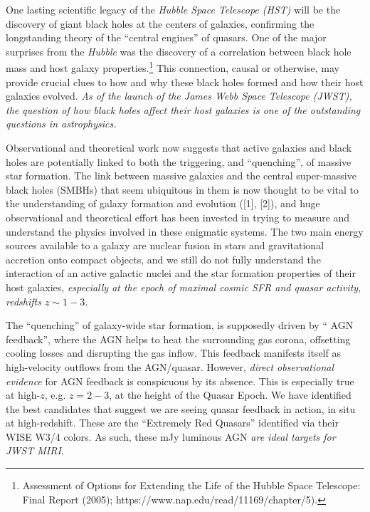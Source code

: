 One lasting scientific legacy of the {\it Hubble Space Telescope
(HST)} will be the discovery of giant black holes at the centers of
galaxies, confirming the longstanding theory of the ``central
engines'' of quasars.  One of the major surprises from the {\it
Hubble} was the discovery of a correlation between black hole mass and
host galaxy properties.\footnote{Assessment of Options for Extending
the Life of the Hubble Space Telescope: Final Report (2005);
https://www.nap.edu/read/11169/chapter/5).}  This connection, causal
or otherwise, may provide crucial clues to how and why these black
holes formed and how their host galaxies evolved. {\it As of the
launch of the James Webb Space Telescope (JWST), the question of how
black holes affect their host galaxies is one of the outstanding
questions in astrophysics.}

\smallskip \smallskip
\noindent
Observational and theoretical work now suggests that active galaxies
and black holes are potentially linked to both the triggering, and
``quenching'', of massive star formation. The link between massive
galaxies and the central super-massive black holes (SMBHs) that seem
ubiquitous in them is now thought to be vital to the understanding of
galaxy formation and evolution ([1], [2]), and huge observational and
theoretical effort has been invested in trying to measure and
understand the physics involved in these enigmatic systems.  The two
main energy sources available to a galaxy are nuclear fusion in stars
and gravitational accretion onto compact objects, and we still do not
fully understand the interaction of an active galactic nuclei and the
star formation properties of their host galaxies, {\it especially at
the epoch of maximal cosmic SFR and quasar activity, redshifts $z\sim1-3$.}

\smallskip \smallskip
\noindent
The ``quenching'' of galaxy-wide star formation, is supposedly driven
by `` AGN feedback'', where the AGN helps to heat the surrounding gas
corona, offsetting cooling losses and disrupting the gas inflow. This
feedback manifests itself as high-velocity outflows from the
AGN/quasar.  However, {\it direct observational evidence} for AGN
feedback is conspicuous by its absence. This is especially true at
high-$z$, e.g. $z=2-3$, at the height of the Quasar Epoch.  We have
identified the best candidates that suggest we are seeing quasar
feedback in action, in situ at high-redshift. These are the
``Extremely Red Quasars'' identified via their WISE W3/4 colors.  As
such, these mJy luminous AGN {\it are ideal targets for JWST
MIRI}.


